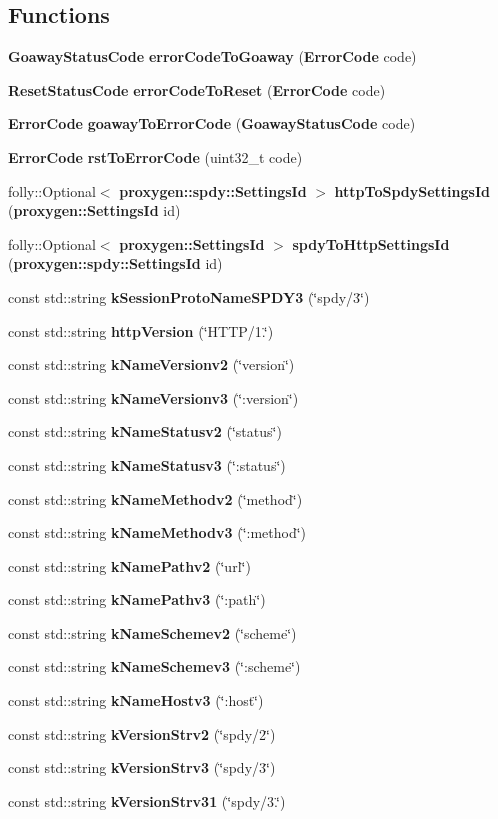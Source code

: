 \subsection*{Functions}
\begin{DoxyCompactItemize}
\item 
{\bf Goaway\+Status\+Code} {\bf error\+Code\+To\+Goaway} ({\bf Error\+Code} code)
\item 
{\bf Reset\+Status\+Code} {\bf error\+Code\+To\+Reset} ({\bf Error\+Code} code)
\item 
{\bf Error\+Code} {\bf goaway\+To\+Error\+Code} ({\bf Goaway\+Status\+Code} code)
\item 
{\bf Error\+Code} {\bf rst\+To\+Error\+Code} (uint32\+\_\+t code)
\item 
folly\+::\+Optional$<$ {\bf proxygen\+::spdy\+::\+Settings\+Id} $>$ {\bf http\+To\+Spdy\+Settings\+Id} ({\bf proxygen\+::\+Settings\+Id} id)
\item 
folly\+::\+Optional$<$ {\bf proxygen\+::\+Settings\+Id} $>$ {\bf spdy\+To\+Http\+Settings\+Id} ({\bf proxygen\+::spdy\+::\+Settings\+Id} id)
\item 
const std\+::string {\bf k\+Session\+Proto\+Name\+S\+P\+D\+Y3} (\char`\"{}spdy/3\char`\"{})
\item 
const std\+::string {\bf http\+Version} (\char`\"{}H\+T\+TP/1.\char`\"{})
\item 
const std\+::string {\bf k\+Name\+Versionv2} (\char`\"{}version\char`\"{})
\item 
const std\+::string {\bf k\+Name\+Versionv3} (\char`\"{}\+:version\char`\"{})
\item 
const std\+::string {\bf k\+Name\+Statusv2} (\char`\"{}status\char`\"{})
\item 
const std\+::string {\bf k\+Name\+Statusv3} (\char`\"{}\+:status\char`\"{})
\item 
const std\+::string {\bf k\+Name\+Methodv2} (\char`\"{}method\char`\"{})
\item 
const std\+::string {\bf k\+Name\+Methodv3} (\char`\"{}\+:method\char`\"{})
\item 
const std\+::string {\bf k\+Name\+Pathv2} (\char`\"{}url\char`\"{})
\item 
const std\+::string {\bf k\+Name\+Pathv3} (\char`\"{}\+:path\char`\"{})
\item 
const std\+::string {\bf k\+Name\+Schemev2} (\char`\"{}scheme\char`\"{})
\item 
const std\+::string {\bf k\+Name\+Schemev3} (\char`\"{}\+:scheme\char`\"{})
\item 
const std\+::string {\bf k\+Name\+Hostv3} (\char`\"{}\+:host\char`\"{})
\item 
const std\+::string {\bf k\+Version\+Strv2} (\char`\"{}spdy/2\char`\"{})
\item 
const std\+::string {\bf k\+Version\+Strv3} (\char`\"{}spdy/3\char`\"{})
\item 
const std\+::string {\bf k\+Version\+Strv31} (\char`\"{}spdy/3.\char`\"{})
\end{DoxyCompactItemize}
